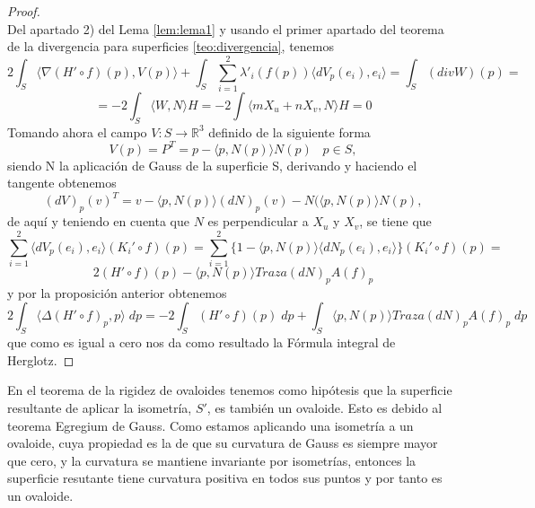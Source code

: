 \begin{proof}
	${ }$\\
	
Del apartado 2) del Lema \ref{lem:lema1} y usando el primer apartado del teorema de la divergencia para superficies \ref{teo:divergencia}, tenemos
${ }$\\
\[
	2 \int_S \langle \nabla (H' \circ f)(p), V(p) \rangle + \int_S \sum_{i=1}^{2} \lambda'_{i}(f(p)) \langle dV_p(e_i), e_i \rangle = \int_S (div W)(p) = 
\]
\[
	= -2 \int_S \langle W, N \rangle H = -2 \int \langle mX_u + nX_v, N \rangle H = 0
\]
${ }$\\

Tomando ahora el campo $V : S \to \mathbb{R}^3$ definido de la siguiente forma
${ }$\\
\[
	V(p) = P^T = p - \langle p, N(p) \rangle N(p) \;\;\; p \in S,
\]
${ }$\\
siendo N la aplicación de Gauss de la superficie S, derivando y haciendo el tangente obtenemos
${ }$\\
\[
	(dV)_p(v)^T = v - \langle p, N(p) \rangle (dN)_p(v) -N(\langle p, N(p) \rangle N(p),
\]
${ }$\\
de aquí y teniendo en cuenta que $N$ es perpendicular a $X_u$ y $X_v$, se tiene que
${ }$\\
\[
	\sum^{2}_{i=1} \langle dV_p (e_i), e_i \rangle (K_{i}' \circ f)(p) = \sum^{2}_{i=1} \{ 1 - \langle p, N(p) \rangle \langle dN_p(e_i), e_i \rangle \} (K_{i}' \circ f)(p) = 
\]
\[
	2 (H' \circ f)(p) - \langle p, N(p) \rangle Traza (dN)_p A(f)_p
\]
${ }$\\
y por la proposición anterior obtenemos
${ }$\\
\[
	2 \int_S \langle \Delta (H' \circ f)_p, p \rangle \; dp = -2 \int_S (H' \circ f)(p) \; dp + \int_S \langle p, N(p) \rangle Traza (dN)_p A(f)_p \; dp
\]
${ }$\\
que como es igual a cero nos da como resultado la Fórmula integral de Herglotz.
\end{proof}
${ }$\\



En el teorema de la rigidez de ovaloides tenemos como hipótesis que la superficie resultante de aplicar la isometría, $S'$, es también un ovaloide. Esto es debido al teorema Egregium de Gauss. Como estamos aplicando una isometría a un ovaloide, cuya propiedad es la de que su curvatura de Gauss es siempre mayor que cero, y la curvatura se mantiene invariante por isometrías, entonces la superficie resutante tiene curvatura positiva en todos sus puntos y por tanto es un ovaloide.
${ }$\\


